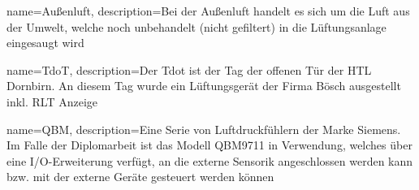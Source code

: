 {
	name=Außenluft,
	description={Bei der Außenluft handelt es sich um die Luft aus der Umwelt, welche noch unbehandelt (nicht gefiltert) in die Lüftungsanlage eingesaugt wird}
}

{
	name=TdoT,
	description={Der Tdot ist der Tag der offenen Tür der HTL Dornbirn. An diesem Tag wurde ein Lüftungsgerät der Firma Bösch ausgestellt inkl. RLT Anzeige}
}

{
	name=QBM,
	description={Eine Serie von Luftdruckfühlern der Marke Siemens. Im Falle der Diplomarbeit ist das Modell QBM9711 in Verwendung, welches über eine I/O-Erweiterung verfügt, an die externe Sensorik angeschlossen werden kann bzw. mit der externe Geräte gesteuert werden können}
}
